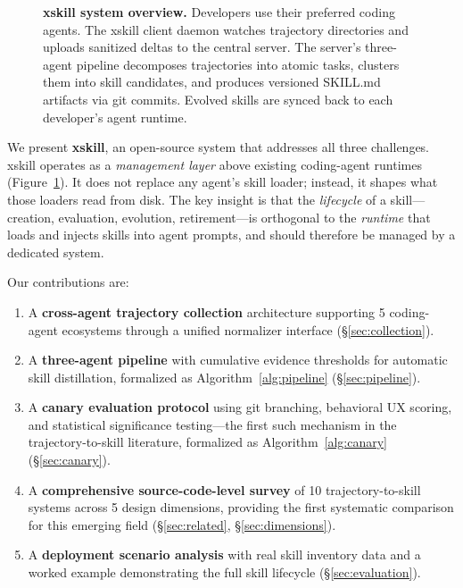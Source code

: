 \documentclass[11pt]{article}
\begin{document}
\begin{figure}[t]
\caption{\textbf{xskill system overview.} Developers use their preferred coding agents. The xskill client daemon watches trajectory directories and uploads sanitized deltas to the central server. The server's three-agent pipeline decomposes trajectories into atomic tasks, clusters them into skill candidates, and produces versioned SKILL.md artifacts via git commits. Evolved skills are synced back to each developer's agent runtime.}
\label{fig:overview}
\end{figure}

We present \textbf{xskill}, an open-source system that addresses all three challenges. xskill operates as a \emph{management layer} above existing coding-agent runtimes (Figure~\ref{fig:overview}). It does not replace any agent's skill loader; instead, it shapes what those loaders read from disk. The key insight is that the \emph{lifecycle} of a skill---creation, evaluation, evolution, retirement---is orthogonal to the \emph{runtime} that loads and injects skills into agent prompts, and should therefore be managed by a dedicated system.

Our contributions are:
\begin{enumerate}
    \item A \textbf{cross-agent trajectory collection} architecture supporting 5 coding-agent ecosystems through a unified normalizer interface (\S\ref{sec:collection}).
    \item A \textbf{three-agent pipeline} with cumulative evidence thresholds for automatic skill distillation, formalized as Algorithm~\ref{alg:pipeline} (\S\ref{sec:pipeline}).
    \item A \textbf{canary evaluation protocol} using git branching, behavioral UX scoring, and statistical significance testing---the first such mechanism in the trajectory-to-skill literature, formalized as Algorithm~\ref{alg:canary} (\S\ref{sec:canary}).
    \item A \textbf{comprehensive source-code-level survey} of 10 trajectory-to-skill systems across 5 design dimensions, providing the first systematic comparison for this emerging field (\S\ref{sec:related}, \S\ref{sec:dimensions}).
    \item A \textbf{deployment scenario analysis} with real skill inventory data and a worked example demonstrating the full skill lifecycle (\S\ref{sec:evaluation}).
\end{enumerate}
\end{document}
